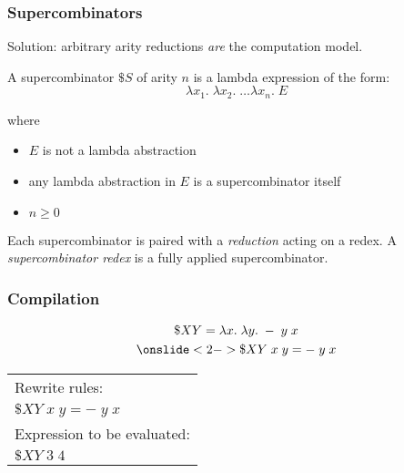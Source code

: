 \documentclass[aspectratio=1610, xcolor={dvipsnames}]{beamer}
\begin{document}
\begin{frame}
    \frametitle{Supercombinators}

    Solution: arbitrary arity reductions \emph{are} the computation model.

    \begin{definition}
        A supercombinator \(\$S\) of arity \(n\) is a lambda expression of the form:
        \begin{equation*}
            \lambda x_1.\; \lambda x_2.\; \ldots \lambda x_n.\; E
        \end{equation*}
        
        where
        \begin{itemize}
            \item \(E\) is not a lambda abstraction
            \item any lambda abstraction in \(E\) is a supercombinator itself
            \item \(n \geq 0\)
        \end{itemize}
    \end{definition}

    \pause
    Each supercombinator is paired with a \emph{reduction} acting on a redex. A
    \emph{supercombinator redex} is a fully applied supercombinator. 

\end{frame}

\begin{frame}
    \frametitle{Compilation}

    \begin{gather*}
        \$XY = \lambda x.\; \lambda y.\; - \;y \;x \\ 
        \onslide<2->{ \$XY \;x \;y = - \;y \;x }
    \end{gather*}

    \pause
    \pause

    \begin{center}
        \begin{tabular}{l}
            Rewrite rules: \\
            \(\$XY \;x \;y = - \;y \;x\) \\
            \hline
            Expression to be evaluated: \\
            \(\$XY \;3 \;4\)
        \end{tabular}
    \end{center}


\end{frame}
\end{document}
